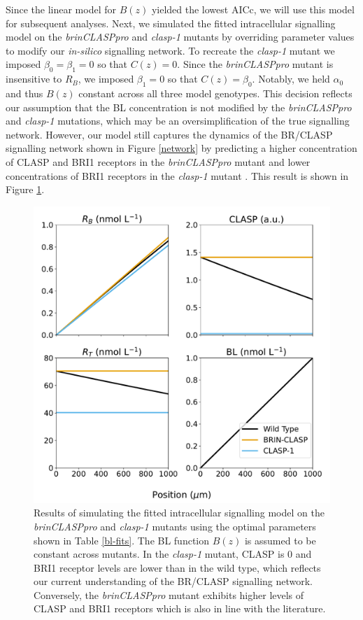 \documentclass[referee,pdflatex,sn-mathphys-num]{sn-jnl}
\begin{document}
Since the linear model for $B(z)$ yielded the lowest AICc, we will use this model for subsequent analyses.
Next, we simulated the fitted intracellular signalling model on the \emph{brinCLASPpro} and \emph{clasp-1} mutants by overriding parameter values to modify our \emph{in-silico} signalling network.
To recreate the \emph{clasp-1} mutant we imposed $\beta_{0} = \beta_{1} = 0$ so that $C(z) = 0$. 
Since the \emph{brinCLASPpro} mutant is insensitive to $R_{B}$, we imposed $\beta_{1} = 0$ so that $C(z) = \beta_{0}$.
Notably, we held $\alpha_{0}$ and thus $B(z)$ constant across all three model genotypes.
This decision reflects our assumption that the BL concentration is not modified by the \emph{brinCLASPpro} and \emph{clasp-1} mutations, which may be an oversimplification of the true signalling network.
However, our model still captures the dynamics of the BR/CLASP signalling network shown in Figure \ref{network} by predicting a higher concentration of CLASP and BRI1 receptors in the \emph{brinCLASPpro} mutant and lower concentrations of BRI1 receptors in the \emph{clasp-1} mutant \cite{ruan2018}.
This result is shown in Figure \ref{bes1-mutants}. 

\begin{figure}
  \centering
  \includegraphics[width=\textwidth]{bes1-mutants.pdf}
  \caption{
Results of simulating the fitted intracellular signalling model on the \emph{brinCLASPpro} and \emph{clasp-1} mutants using the optimal parameters shown in Table \ref{bl-fits}.
The BL function $B(z)$ is assumed to be constant across mutants.
In the \emph{clasp-1} mutant, CLASP is $0$ and BRI1 receptor levels are lower than in the wild type, which reflects our current understanding of the BR/CLASP signalling network.
Conversely, the \emph{brinCLASPpro} mutant exhibits higher levels of CLASP and BRI1 receptors which is also in line with the literature.
  }
\label{bes1-mutants}
\end{figure}
\end{document}
